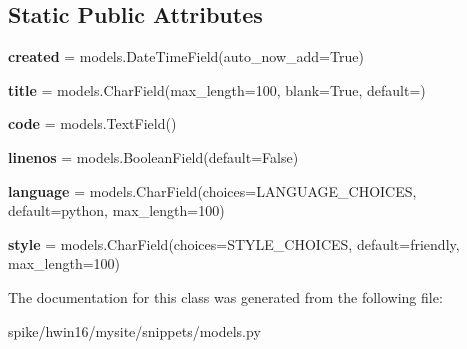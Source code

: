 \subsection*{Static Public Attributes}
\begin{DoxyCompactItemize}
\item 
\mbox{\label{classsnippets_1_1models_1_1_snippet_aedeb681049e2596085770c48f1af922a}} 
{\bfseries created} = models.\+Date\+Time\+Field(auto\+\_\+now\+\_\+add=True)
\item 
\mbox{\label{classsnippets_1_1models_1_1_snippet_a5bbd359692f190d321e36794640b117d}} 
{\bfseries title} = models.\+Char\+Field(max\+\_\+length=100, blank=True, default=\textquotesingle{}\textquotesingle{})
\item 
\mbox{\label{classsnippets_1_1models_1_1_snippet_ae1cb46d6f6321b5273615704befaaac1}} 
{\bfseries code} = models.\+Text\+Field()
\item 
\mbox{\label{classsnippets_1_1models_1_1_snippet_aa8c07e2028d393a3589270f520eaedbc}} 
{\bfseries linenos} = models.\+Boolean\+Field(default=False)
\item 
\mbox{\label{classsnippets_1_1models_1_1_snippet_af329e6de0796608bb90566efac1d9196}} 
{\bfseries language} = models.\+Char\+Field(choices=L\+A\+N\+G\+U\+A\+G\+E\+\_\+\+C\+H\+O\+I\+C\+ES, default=\textquotesingle{}python\textquotesingle{}, max\+\_\+length=100)
\item 
\mbox{\label{classsnippets_1_1models_1_1_snippet_aeb520e7dab031a04833cc0678822441e}} 
{\bfseries style} = models.\+Char\+Field(choices=S\+T\+Y\+L\+E\+\_\+\+C\+H\+O\+I\+C\+ES, default=\textquotesingle{}friendly\textquotesingle{}, max\+\_\+length=100)
\end{DoxyCompactItemize}


The documentation for this class was generated from the following file\+:\begin{DoxyCompactItemize}
\item 
spike/hwin16/mysite/snippets/models.\+py\end{DoxyCompactItemize}
